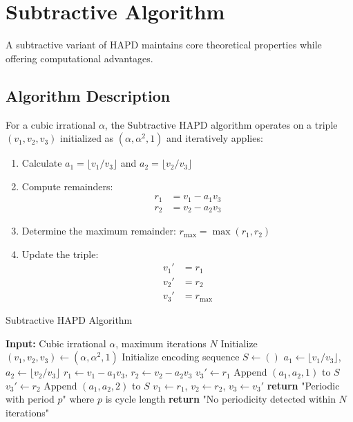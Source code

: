 \section{Subtractive Algorithm}\label{sec:subtractive_algorithm}

A subtractive variant of HAPD maintains core theoretical properties while offering computational advantages.

\subsection{Algorithm Description}

\begin{definition}\label{def:subtractive_hapd}
For a cubic irrational $\alpha$, the Subtractive HAPD algorithm operates on a triple $(v_1, v_2, v_3)$ initialized as $(\alpha, \alpha^2, 1)$ and iteratively applies:

\begin{enumerate}
    \item Calculate $a_1 = \lfloor v_1/v_3 \rfloor$ and $a_2 = \lfloor v_2/v_3 \rfloor$
    \item Compute remainders:
    \begin{align}
        r_1 &= v_1 - a_1v_3 \\
        r_2 &= v_2 - a_2v_3
    \end{align}
    \item Determine the maximum remainder: $r_{\text{max}} = \max(r_1, r_2)$
    \item Update the triple:
    \begin{align}
        v_1' &= r_1 \\
        v_2' &= r_2 \\
        v_3' &= r_{\text{max}}
    \end{align}
\end{enumerate}
\end{definition}

\begin{algorithm}[H]
\caption{Subtractive HAPD Algorithm}\label{alg:subtractive_hapd}
\begin{algorithmic}[1]
\State \textbf{Input:} Cubic irrational $\alpha$, maximum iterations $N$
\State Initialize $(v_1, v_2, v_3) \gets (\alpha, \alpha^2, 1)$
\State Initialize encoding sequence $S \gets ()$
    \State $a_1 \gets \lfloor v_1/v_3 \rfloor$, $a_2 \gets \lfloor v_2/v_3 \rfloor$
    \State $r_1 \gets v_1 - a_1v_3$, $r_2 \gets v_2 - a_2v_3$
        \State $v_3' \gets r_1$
        \State Append $(a_1, a_2, 1)$ to $S$
    \Else
        \State $v_3' \gets r_2$
        \State Append $(a_1, a_2, 2)$ to $S$
    \EndIf
    \State $v_1 \gets r_1$, $v_2 \gets r_2$, $v_3 \gets v_3'$
        \State \textbf{return} "Periodic with period $p$" where $p$ is cycle length
    \EndIf
\EndFor
\State \textbf{return} "No periodicity detected within $N$ iterations"
\end{algorithmic}
\end{algorithm}

